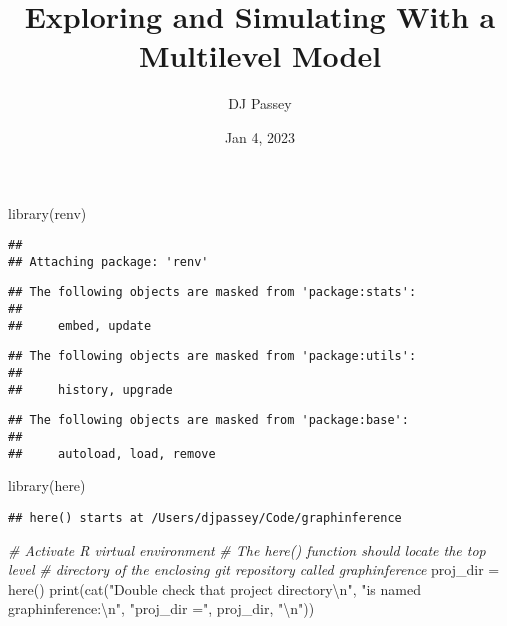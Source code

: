 \documentclass[
]{article}
\title{Exploring and Simulating With a Multilevel Model}
\author{DJ Passey}
\date{Jan 4, 2023}
\newenvironment{Shaded}{\begin{snugshade}}{\end{snugshade}}
\newcommand{\CommentTok}[1]{\textcolor[rgb]{0.56,0.35,0.01}{\textit{#1}}}
\newcommand{\FunctionTok}[1]{\textcolor[rgb]{0.00,0.00,0.00}{#1}}
\newcommand{\NormalTok}[1]{#1}
\newcommand{\OtherTok}[1]{\textcolor[rgb]{0.56,0.35,0.01}{#1}}
\newcommand{\SpecialCharTok}[1]{\textcolor[rgb]{0.00,0.00,0.00}{#1}}
\newcommand{\StringTok}[1]{\textcolor[rgb]{0.31,0.60,0.02}{#1}}
\begin{document}
\maketitle

\begin{Shaded}
\begin{Highlighting}[]
\FunctionTok{library}\NormalTok{(renv)}
\end{Highlighting}
\end{Shaded}

\begin{verbatim}
## 
## Attaching package: 'renv'
\end{verbatim}

\begin{verbatim}
## The following objects are masked from 'package:stats':
## 
##     embed, update
\end{verbatim}

\begin{verbatim}
## The following objects are masked from 'package:utils':
## 
##     history, upgrade
\end{verbatim}

\begin{verbatim}
## The following objects are masked from 'package:base':
## 
##     autoload, load, remove
\end{verbatim}

\begin{Shaded}
\begin{Highlighting}[]
\FunctionTok{library}\NormalTok{(here)}
\end{Highlighting}
\end{Shaded}

\begin{verbatim}
## here() starts at /Users/djpassey/Code/graphinference
\end{verbatim}

\begin{Shaded}
\begin{Highlighting}[]
\CommentTok{\# Activate R virtual environment}
\CommentTok{\# The \textasciigrave{}here()\textasciigrave{} function should locate the top level}
\CommentTok{\# directory of the enclosing git repository called \textasciigrave{}graphinference\textasciigrave{}}
\NormalTok{proj\_dir }\OtherTok{=} \FunctionTok{here}\NormalTok{()}
\FunctionTok{print}\NormalTok{(}\FunctionTok{cat}\NormalTok{(}\StringTok{"Double check that project directory}\SpecialCharTok{\textbackslash{}n}\StringTok{"}\NormalTok{,}
          \StringTok{"is named graphinference:}\SpecialCharTok{\textbackslash{}n}\StringTok{"}\NormalTok{, }
          \StringTok{"proj\_dir ="}\NormalTok{, proj\_dir, }\StringTok{"}\SpecialCharTok{\textbackslash{}n}\StringTok{"}\NormalTok{))}
\end{Highlighting}
\end{Shaded}
\end{document}
